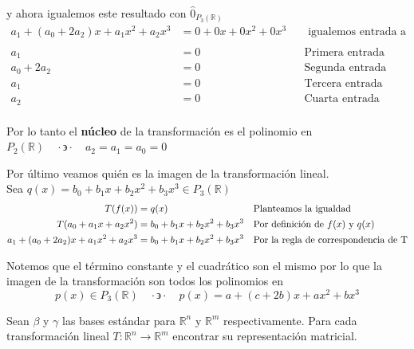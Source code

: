 \documentclass[letterpaper]{article}
\newcommand{\tq}{ \quad \cdot  \backepsilon \cdot \quad }
\newcommand{\R}{\mathds{R}}
\renewcommand{\*}{\cdot}
\theoremstyle{definition}
\begin{document}
	y ahora igualemos este resultado con $ \hat{0}_{P_3 (\R)} $
	\begin{align*}
		 a_1 + (a_0 + 2a_2)x  + a_1 x^2 + a_2 x^3 &= 0 + 0x + 0x^2 + 0x^3 && \text{ igualemos entrada a entrada}\\
		 \\
		 a_1 &= 0 && \text{Primera entrada}\\
		 a_0 + 2a_2 &= 0 && \text{Segunda entrada}\\
		 a_1 &= 0 && \text{Tercera entrada}\\
		 a_2 &= 0 && \text{Cuarta entrada}\\
	\end{align*}
	\begin{center}
		Por lo tanto el \textbf{núcleo} de la transformación es el polinomio en $ P_2 (\R) \tq a_2 = a_1 = a_0 = 0$
	\end{center}
	Por último veamos quién es la imagen de la transformación lineal. \\
	Sea $ q(x) = b_0 + b_1 x + b_2 x^2 + b_3 x^3 \in P_3 (\R)  $
	\begin{align*}
		T(f(x)) & = q(x) && \text{Planteamos la igualdad} \\
		T(a_0 + a_1 x + a_2 x^2) & = b_0 + b_1 x + b_2 x^2 + b_3 x^3 && \text{Por definición de $ f(x) $ y $ q(x) $} \\
		a_1 + (a_0 + 2a_2)x  + a_1 x^2 + a_2 x^3 &= b_0 + b_1 x + b_2 x^2+ b_3 x^3 && \text{Por la regla de correspondencia de T}\\
	\end{align*}
	
	Notemos que el término constante y el cuadrático son el mismo por lo que la imagen de la transformación son todos los polinomios en 
	$$ p(x) \in P_3 (\R) \tq p(x) = a + (c + 2b)x + ax^2 + bx^3  $$
	\begin{ejercicio}{11}
		Sean $\beta$ y $\gamma$ las bases estándar para $\mathbb{R}^{n}$ y $\mathbb{R}^{m}$ respectivamente. Para cada transformación lineal $T: \mathbb{R}^{n} \longrightarrow \mathbb{R}^{m}$ encontrar su representación matricial.
	\end{ejercicio}
	
\end{document}
